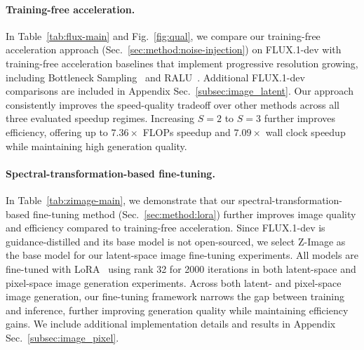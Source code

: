 \paragraph{Training-free acceleration.} In Table~\ref{tab:flux-main} and Fig.~\ref{fig:qual}, we compare our training-free acceleration approach (Sec.~\ref{sec:method:noise-injection}) on FLUX.1-dev with training-free acceleration baselines that implement progressive resolution growing, including Bottleneck Sampling~\citep{bottleneck} and RALU~\citep{ralu}. Additional FLUX.1-dev comparisons are included in Appendix Sec.~\ref{subsec:image_latent}. Our approach consistently improves the speed-quality tradeoff over other methods across all three evaluated speedup regimes. Increasing $S=2$ to $S=3$ further improves efficiency, offering up to $7.36 \times$ FLOPs speedup and $7.09 \times$ wall clock speedup while maintaining high generation quality.




\vspace{-5pt}
\paragraph{Spectral-transformation-based fine-tuning.} In Table~\ref{tab:zimage-main}, we demonstrate that our spectral-transformation-based fine-tuning method (Sec.~\ref{sec:method:lora}) further improves image quality and efficiency compared to training-free acceleration. Since FLUX.1-dev is guidance-distilled and its base model is not open-sourced, we select Z-Image \citep{zimage} as the base model for our latent-space image fine-tuning experiments. All models are fine-tuned with LoRA~\citep{hu2021lora} using rank 32 for 2000 iterations in both latent-space and pixel-space image generation experiments. Across both latent- and pixel-space image generation, our fine-tuning framework narrows the gap between training and inference, further improving generation quality while maintaining efficiency gains. %
We include additional implementation details and results in Appendix Sec.~\ref{subsec:image_pixel}.

